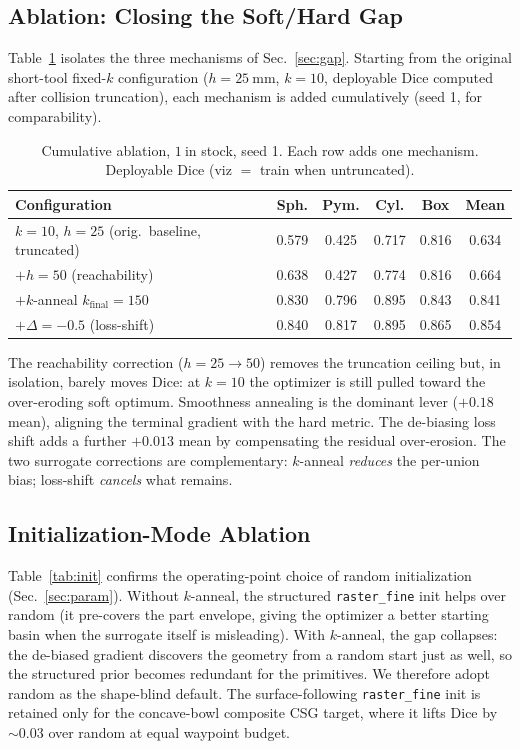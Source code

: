 \subsection{Ablation: Closing the Soft/Hard Gap}
\label{sec:ablation}

Table~\ref{tab:ablation} isolates the three mechanisms of
Sec.~\ref{sec:gap}. Starting from the original short-tool fixed-$k$ configuration
($h{=}25~\mathrm{mm}$, $k{=}10$, deployable Dice computed after collision
truncation), each mechanism is added cumulatively (seed 1, for comparability).

\begin{table}[t]
  \centering
  \caption{Cumulative ablation, $1~\mathrm{in}$ stock, seed 1. Each row adds one mechanism. Deployable Dice (viz $=$ train when untruncated).}
  \label{tab:ablation}
  \small
  \begin{tabular}{lccccc}
    \toprule
    Configuration & Sph. & Pym. & Cyl. & Box & Mean \\
    \midrule
    $k{=}10$, $h{=}25$ (orig.\ baseline, truncated) & 0.579 & 0.425 & 0.717 & 0.816 & 0.634 \\
    $+ h{=}50$ (reachability)              & 0.638 & 0.427 & 0.774 & 0.816 & 0.664 \\
    $+ k$-anneal $k_{\mathrm{final}}{=}150$ & 0.830 & 0.796 & 0.895 & 0.843 & 0.841 \\
    $+ \Delta{=}-0.5$ (loss-shift)         & 0.840 & 0.817 & 0.895 & 0.865 & 0.854 \\
    \bottomrule
  \end{tabular}
\end{table}

The reachability correction ($h{=}25 \to 50$) removes the truncation ceiling but,
in isolation, barely moves Dice: at $k{=}10$ the optimizer is still pulled toward
the over-eroding soft optimum. Smoothness annealing is the dominant lever
($+0.18$ mean), aligning the terminal gradient with the hard metric. The
de-biasing loss shift adds a further $+0.013$ mean by compensating the residual
over-erosion. The two surrogate corrections are complementary: $k$-anneal
\emph{reduces} the per-union bias; loss-shift \emph{cancels} what remains.

\subsection{Initialization-Mode Ablation}
\label{sec:init-ablation}

Table~\ref{tab:init} confirms the operating-point choice of random
initialization (Sec.~\ref{sec:param}). Without $k$-anneal, the structured
\texttt{raster\_fine} init helps over random (it pre-covers the part envelope,
giving the optimizer a better starting basin when the surrogate itself is
misleading). With $k$-anneal, the gap collapses: the de-biased gradient discovers
the geometry from a random start just as well, so the structured prior becomes
redundant for the primitives. We therefore adopt random as the shape-blind
default. The surface-following \texttt{raster\_fine} init is retained only for
the concave-bowl composite CSG target, where it lifts Dice by $\sim 0.03$ over
random at equal waypoint budget.

